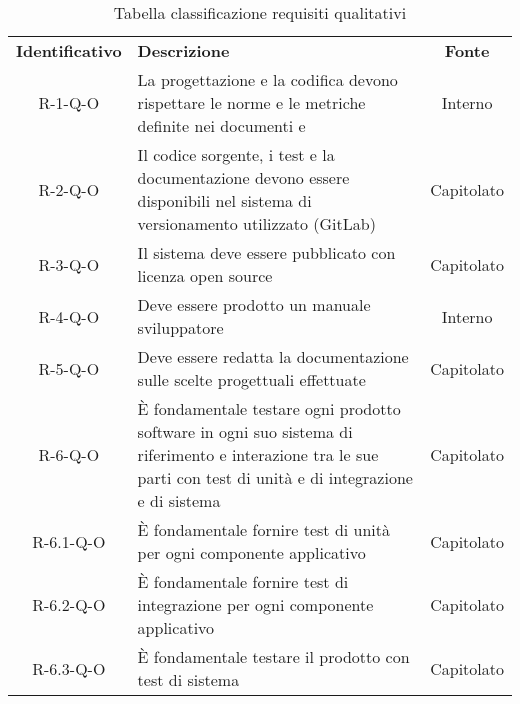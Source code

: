 \renewcommand{\arraystretch}{1.5}
\begin{longtable}{ c C{9cm} c }
    \caption{Tabella classificazione requisiti qualitativi}\\
    \rowcolor{\primaryColor}
    \textcolor{\secondaryColor}{
    \textbf{Identificativo}} & \textcolor{\secondaryColor}{\textbf{Descrizione}}                                                            & \textcolor{\secondaryColor}
    {\textbf{Fonte}}                                                                                                                                                      \\


    R-1-Q-O     & La progettazione e la codifica devono rispettare le norme e le metriche definite nei documenti \NdPv{} e \PdQv{} & Interno\\
    R-2-Q-O     & Il codice sorgente, i test e la documentazione devono essere disponibili nel sistema di versionamento utilizzato (GitLab) & Capitolato\\
    R-3-Q-O     & Il sistema deve essere pubblicato con licenza open source & Capitolato\\
    R-4-Q-O     & Deve essere prodotto un manuale sviluppatore & Interno \\
    R-5-Q-O     & Deve essere redatta la documentazione sulle scelte progettuali effettuate & Capitolato \\
    R-6-Q-O     & \`{E} fondamentale testare ogni prodotto software in ogni suo sistema di riferimento e interazione tra le sue parti con test di unità e di integrazione e di sistema & Capitolato\\
    R-6.1-Q-O   & \`{E} fondamentale fornire test di unità per ogni componente applicativo & Capitolato \\
    R-6.2-Q-O   & \`{E} fondamentale fornire test di integrazione per ogni componente applicativo & Capitolato \\
    R-6.3-Q-O   & \`{E} fondamentale testare il prodotto con test di sistema & Capitolato \\




\end{longtable}